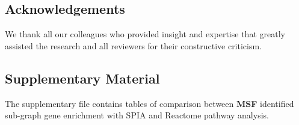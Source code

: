 \documentclass[10pt,a4paper,twocolumn]{article}
\begin{document}
\subsection*{Acknowledgements}

We thank all our colleagues who provided insight and expertise that
greatly assisted the research and all reviewers for their constructive
criticism.

\subsection*{Supplementary Material}

The supplementary file contains tables of comparison between
\textbf{MSF} identified sub-graph gene enrichment with SPIA and
Reactome pathway analysis.

{\small
}

\bigskip





\begin{figure}[p]
	\centering
\end{figure}
\end{document}
